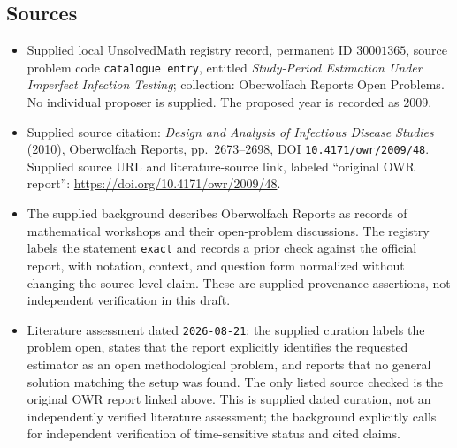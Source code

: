\documentclass[11pt]{article}
\begin{document}
\subsection{Sources}
\begin{itemize}
\item Supplied local UnsolvedMath registry record, permanent ID \(30001365\), source problem code \texttt{catalogue entry}, entitled \emph{Study-Period Estimation Under Imperfect Infection Testing}; collection: Oberwolfach Reports Open Problems. No individual proposer is supplied. The proposed year is recorded as 2009.
\item Supplied source citation: \emph{Design and Analysis of Infectious Disease Studies} (2010), Oberwolfach Reports, pp.~2673--2698, DOI \texttt{10.4171/owr/2009/48}. Supplied source URL and literature-source link, labeled ``original OWR report'': \url{https://doi.org/10.4171/owr/2009/48}.
\item The supplied background describes Oberwolfach Reports as records of mathematical workshops and their open-problem discussions. The registry labels the statement \texttt{exact} and records a prior check against the official report, with notation, context, and question form normalized without changing the source-level claim. These are supplied provenance assertions, not independent verification in this draft.
\item Literature assessment dated \texttt{2026-08-21}: the supplied curation labels the problem open, states that the report explicitly identifies the requested estimator as an open methodological problem, and reports that no general solution matching the setup was found. The only listed source checked is the original OWR report linked above. This is supplied dated curation, not an independently verified literature assessment; the background explicitly calls for independent verification of time-sensitive status and cited claims.
\end{itemize}
\end{document}

